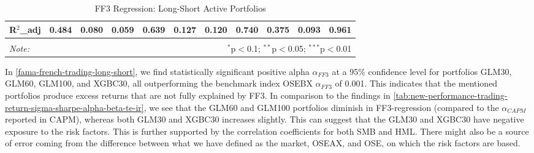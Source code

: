 \begin{table}[H]
\begin{tabularx}{\textwidth}{XXXX|XXX|XXX|l}
R$^{2}$_{adj} & 0.484 & 0.080 & 0.059 & 0.639 & 0.127 & 0.120 & 0.740 & 0.375 & 0.093 & 0.961 \\ 
\hline 
\hline \\[-2ex] 
\textit{Note:}  & \multicolumn{10}{r}{$^{*}$p$<$0.1; $^{**}$p$<$0.05; $^{***}$p$<$0.01} \\ 
\end{tabularx}
\vspace{1em}
\caption{{FF3 Regression: Long-Short Active Portfolios}} 
\label{fama-french-trading-long-short} 
\end{table} 


In \autoref{fama-french-trading-long-short}, we find statistically significant positive alpha $\alpha_{FF3}$ at a 95\% confidence level for portfolios GLM30, GLM60, GLM100, and XGBC30, all outperforming the benchmark index OSEBX $\alpha_{FF3}$ of 0.001. This indicates that the mentioned portfolios produce excess returns that are not fully explained by FF3. In comparison to the findings in \autoref{tab:new-performance-trading-return-sigma-sharpe-alpha-beta-te-ir}, we see that the GLM60 and GLM100 portfolios diminish in FF3-regression (compared to the $\alpha_{CAPM}$ reported in CAPM), whereas both GLM30 and XGBC30 increases slightly. This can suggest that the GLM30 and XGBC30 have negative exposure to the risk factors. This is further supported by the correlation coefficients for both SMB and HML. There might also be a source of error coming from the difference between what we have defined as the market, OSEAX, and OSE, on which the risk factors are based. 

